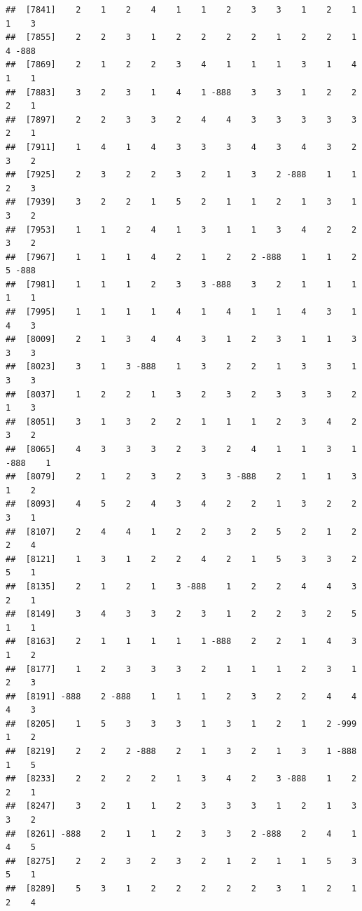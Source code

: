 \documentclass[
  12pt,
  openany]{book}
\begin{document}
\begin{verbatim}
##  [7841]    2    1    2    4    1    1    2    3    3    1    2    1    1    3
##  [7855]    2    2    3    1    2    2    2    2    1    2    2    1    4 -888
##  [7869]    2    1    2    2    3    4    1    1    1    3    1    4    1    1
##  [7883]    3    2    3    1    4    1 -888    3    3    1    2    2    2    1
##  [7897]    2    2    3    3    2    4    4    3    3    3    3    3    2    1
##  [7911]    1    4    1    4    3    3    3    4    3    4    3    2    3    2
##  [7925]    2    3    2    2    3    2    1    3    2 -888    1    1    2    3
##  [7939]    3    2    2    1    5    2    1    1    2    1    3    1    3    2
##  [7953]    1    1    2    4    1    3    1    1    3    4    2    2    3    2
##  [7967]    1    1    1    4    2    1    2    2 -888    1    1    2    5 -888
##  [7981]    1    1    1    2    3    3 -888    3    2    1    1    1    1    1
##  [7995]    1    1    1    1    4    1    4    1    1    4    3    1    4    3
##  [8009]    2    1    3    4    4    3    1    2    3    1    1    3    3    3
##  [8023]    3    1    3 -888    1    3    2    2    1    3    3    1    3    3
##  [8037]    1    2    2    1    3    2    3    2    3    3    3    2    1    3
##  [8051]    3    1    3    2    2    1    1    1    2    3    4    2    3    2
##  [8065]    4    3    3    3    2    3    2    4    1    1    3    1 -888    1
##  [8079]    2    1    2    3    2    3    3 -888    2    1    1    3    1    2
##  [8093]    4    5    2    4    3    4    2    2    1    3    2    2    3    1
##  [8107]    2    4    4    1    2    2    3    2    5    2    1    2    2    4
##  [8121]    1    3    1    2    2    4    2    1    5    3    3    2    5    1
##  [8135]    2    1    2    1    3 -888    1    2    2    4    4    3    2    1
##  [8149]    3    4    3    3    2    3    1    2    2    3    2    5    1    1
##  [8163]    2    1    1    1    1    1 -888    2    2    1    4    3    1    2
##  [8177]    1    2    3    3    3    2    1    1    1    2    3    1    2    3
##  [8191] -888    2 -888    1    1    1    2    3    2    2    4    4    4    3
##  [8205]    1    5    3    3    3    1    3    1    2    1    2 -999    1    2
##  [8219]    2    2    2 -888    2    1    3    2    1    3    1 -888    1    5
##  [8233]    2    2    2    2    1    3    4    2    3 -888    1    2    2    1
##  [8247]    3    2    1    1    2    3    3    3    1    2    1    3    3    2
##  [8261] -888    2    1    1    2    3    3    2 -888    2    4    1    4    5
##  [8275]    2    2    3    2    3    2    1    2    1    1    5    3    5    1
##  [8289]    5    3    1    2    2    2    2    2    3    1    2    1    2    4

\end{verbatim}
\end{document}
